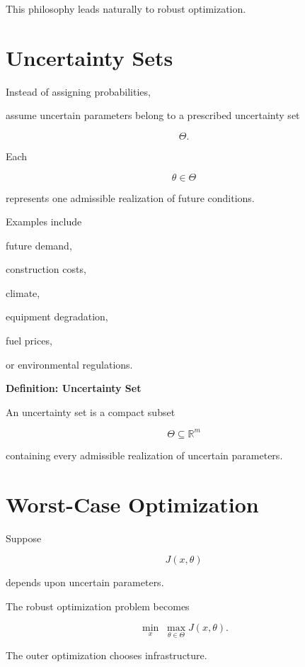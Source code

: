 \documentclass[11pt,fleqn]{book}
\numberwithin{equation}{chapter}
\newenvironment{definition}[1]
  {\begin{definitionEnv}
   \noindent\textbf{Definition: #1}\par\smallskip}
  {\end{definitionEnv}}
\theoremstyle{plain}
\theoremstyle{definition}
\theoremstyle{remark}
\begin{document}
This philosophy leads naturally to robust optimization.


\section{Uncertainty Sets}

Instead of assigning probabilities,

assume uncertain parameters belong to a prescribed uncertainty set

\[
\Theta.
\]

Each

\[
\theta\in\Theta
\]

represents one admissible realization of future conditions.

Examples include

future demand,

construction costs,

climate,

equipment degradation,

fuel prices,

or environmental regulations.


\begin{definition}{Uncertainty Set}

An uncertainty set is a compact subset

\[
\Theta\subseteq\mathbb R^m
\]

containing every admissible realization of uncertain parameters.

\end{definition}


\section{Worst-Case Optimization}

Suppose

\[
J(x,\theta)
\]

depends upon uncertain parameters.

The robust optimization problem becomes

\[
\boxed{
\min_x
\;
\max_{\theta\in\Theta}
J(x,\theta).
}
\]

The outer optimization chooses infrastructure.
\end{document}
